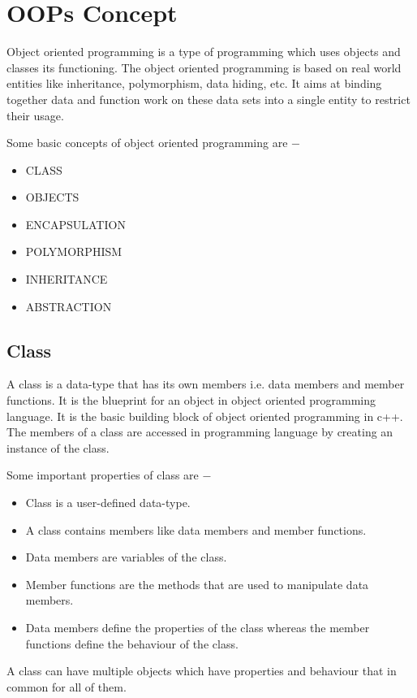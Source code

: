 \documentclass[10pt,a4paper,twoside]{article}
\begin{document}
\section{OOPs Concept}
\item Object oriented programming is a type of programming which uses objects and classes its functioning. The object oriented programming is based on real world entities like inheritance, polymorphism, data hiding, etc. It aims at binding together data and function work on these data sets into a single entity to restrict their usage.
\item Some basic concepts of object oriented programming are −
\begin{itemize}
\item     CLASS
\item     OBJECTS
\item     ENCAPSULATION
\item     POLYMORPHISM
\item     INHERITANCE
\item     ABSTRACTION
\end{itemize}

\subsection{Class} 
\item A class is a data-type that has its own members i.e. data members and member functions. It is the blueprint for an object in object oriented programming language. It is the basic building block of object oriented programming in c++. The members of a class are accessed in programming language by creating an instance of the class.
\item Some important properties of class are −
\begin{itemize}
\item Class is a user-defined data-type.
\item     A class contains members like data members and member functions.
\item     Data members are variables of the class.
\item     Member functions are the methods that are used to manipulate data members.
\item     Data members define the properties of the class whereas the member functions define the behaviour of the class.
\end{itemize}
\item A class can have multiple objects which have properties and behaviour that in common for all of them.
\end{document}
